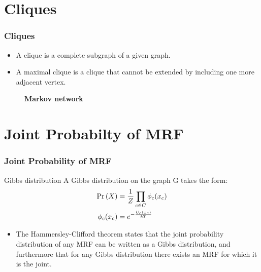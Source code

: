 \documentclass{beamer}
\begin{document}
\section{Cliques}
\begin{frame}[fragile]
\frametitle{Cliques}
\begin{flushleft}
\begin{itemize}
    \item A clique is a complete subgraph of a given graph.\\
    \item A maximal clique is a clique that cannot be extended by including one more adjacent vertex.
\end{itemize}
\begin{figure}[h]
\centering
{}
\caption*{\textbf{Markov network}}
\end{figure}
\end{flushleft}
\end{frame}
\section{Joint Probabilty of MRF}
\begin{frame}
\frametitle{Joint Probability of MRF}
\begin{flushleft}
\begin{block}{Gibbs distribution}
A Gibbs distribution on the graph G takes the form:
\begin{align}
    \Pr\left(X\right) &= \frac{1}{Z}\prod_{c\in C}\phi_c(x_c)\\
    \phi_c(x_c) &= e^{-\frac{U_c(x_c)}{kT}}
\end{align}
\end{block}
\begin{itemize}
    \item The Hammersley-Clifford theorem states that the joint probability distribution of any MRF can be written as a Gibbs distribution, and furthermore that for any Gibbs distribution there exists an MRF for which it is the joint. 
\end{itemize}
\end{flushleft}
\end{frame}
\end{document}
